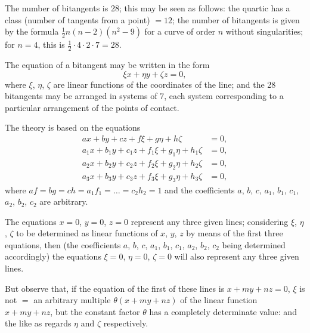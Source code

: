 \documentclass[11pt,a4paper]{book}
\begin{document}
The number of bitangents is 28; this may be seen as follows: the quartic has a class (number of tangents from a point) $= 12$; the number of bitangents is given by the formula $\frac{1}{2}n(n-2)(n^2-9)$ for a curve of order $n$ without singularities; for $n=4$, this is $\frac{1}{2}\cdot 4\cdot 2\cdot 7 = 28$.

The equation of a bitangent may be written in the form
\[
\xi x + \eta y + \zeta z = 0,
\]
where $\xi$, $\eta$, $\zeta$ are linear functions of the coordinates of the line; and the 28 bitangents may be arranged in systems of 7, each system corresponding to a particular arrangement of the points of contact.

The theory is based on the equations
\begin{align*}
ax + by + cz + f\xi + g\eta + h\zeta &= 0,\\
a_1x + b_1y + c_1z + f_1\xi + g_1\eta + h_1\zeta &= 0,\\
a_2x + b_2y + c_2z + f_2\xi + g_2\eta + h_2\zeta &= 0,\\
a_3x + b_3y + c_3z + f_3\xi + g_3\eta + h_3\zeta &= 0,
\end{align*}
where $af = bg = ch = a_1f_1 = \ldots = c_2h_2 = 1$ and the coefficients $a$, $b$, $c$, $a_1$, $b_1$, $c_1$, $a_2$, $b_2$, $c_2$ are arbitrary.

The equations $x=0$, $y=0$, $z=0$ represent any three given lines; considering $\xi$, $\eta$, $\zeta$ to be determined as linear functions of $x$, $y$, $z$ by means of the first three equations, then (the coefficients $a$, $b$, $c$, $a_1$, $b_1$, $c_1$, $a_2$, $b_2$, $c_2$ being determined accordingly) the equations $\xi=0$, $\eta=0$, $\zeta=0$ will also represent any three given lines.

But observe that, if the equation of the first of these lines is $x + my + nz = 0$, $\xi$ is not $=$ an arbitrary multiple $\theta(x + my + nz)$ of the linear function $x + my + nz$, but the constant factor $\theta$ has a completely determinate value: and the like as regards $\eta$ and $\zeta$ respectively.
\end{document}
